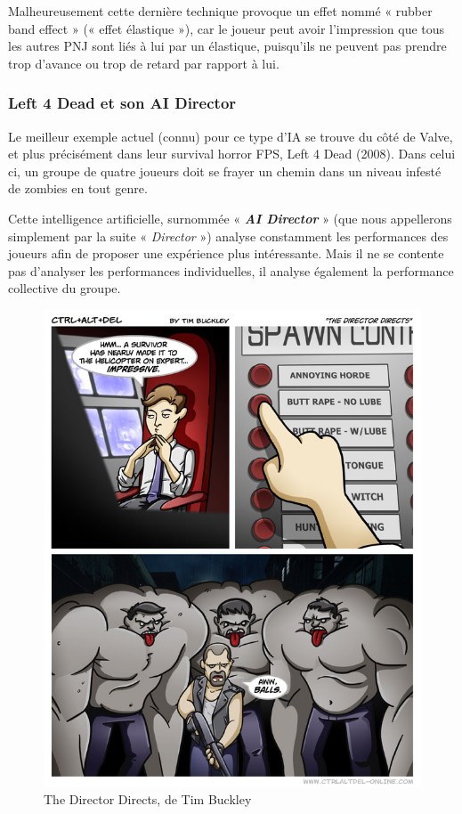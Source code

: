 \documentclass[a4paper, 12pt]{article} %
\begin{document}
Malheureusement cette dernière technique provoque un effet nommé « rubber band effect » (« effet élastique »), car le joueur peut avoir l’impression que tous les autres PNJ sont liés à lui par un élastique, puisqu’ils ne peuvent pas prendre trop d’avance ou trop de retard par rapport à lui.

\newpage
\subsubsection{Left 4 Dead et son AI Director}

Le meilleur exemple actuel (connu) pour ce type d’IA se trouve du côté de Valve, et plus précisément dans leur survival horror FPS, Left 4 Dead (2008). Dans celui ci, un groupe de quatre joueurs doit se frayer un chemin dans un niveau infesté de zombies en tout genre.

Cette intelligence artificielle, surnommée « \textbf{\textit{AI Director}} »\cite{aidirector} (que nous appellerons simplement par la suite « \textit{Director} ») analyse constamment les performances des joueurs afin de proposer une expérience plus intéressante. Mais il ne se contente pas d’analyser les performances individuelles, il analyse également la performance collective du groupe.

\begin{figure}[!h]%
	\begin{center} 
		\includegraphics[width=0.60\columnwidth]{images/aiDirector.png}%
		\caption{The Director Directs, de Tim Buckley}%
	\end{center}
\end{figure}
\end{document}
